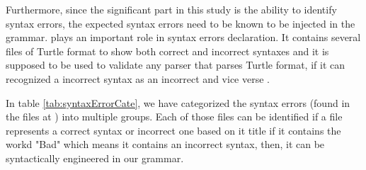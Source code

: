  Furthermore, since the significant part in this study is the ability to identify syntax errors, the expected syntax errors need to be known to be injected in the grammar. \cite{TurtleTests:Online} plays an important role in syntax errors declaration. It contains several files of Turtle format to show both correct and incorrect syntaxes and it is supposed to be used to validate any parser that parses Turtle format, if it can recognized a incorrect syntax as an incorrect and vice verse . 
 
 In table \ref{tab:syntaxErrorCate}, we have categorized the syntax errors (found in the files at \cite{TurtleTests:Online}) into multiple groups. Each of those files can be identified if a file represents a correct syntax or incorrect one based on it title if it contains the workd "Bad" which means it contains an incorrect syntax, then, it can be syntactically engineered in our grammar.  
 

